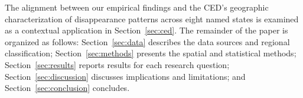 \noindent The alignment between our empirical findings and the CED's geographic characterization of disappearance patterns across eight named states is examined as a contextual application in Section~\ref{sec:ced}.
The remainder of the paper is organized as follows: Section~\ref{sec:data} describes the data sources and regional classification; Section~\ref{sec:methods} presents the spatial and statistical methods; Section~\ref{sec:results} reports results for each research question; Section~\ref{sec:discussion} discusses implications and limitations; and Section~\ref{sec:conclusion} concludes.